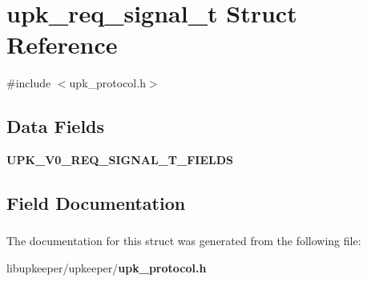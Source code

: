 \section{upk\_\-req\_\-signal\_\-t Struct Reference}
\label{structupk__req__signal__t}


{\ttfamily \#include $<$upk\_\-protocol.h$>$}

\subsection*{Data Fields}
\begin{DoxyCompactItemize}
\item 
{\bf UPK\_\-V0\_\-REQ\_\-SIGNAL\_\-T\_\-FIELDS}
\end{DoxyCompactItemize}


\subsection{Field Documentation}
\subsubsection[{UPK\_\-V0\_\-REQ\_\-SIGNAL\_\-T\_\-FIELDS}]{}\label{structupk__req__signal__t_ab7fb5ea2d5f44e08782fae707d7b516f}


The documentation for this struct was generated from the following file:\begin{DoxyCompactItemize}
\item 
libupkeeper/upkeeper/{\bf upk\_\-protocol.h}\end{DoxyCompactItemize}
